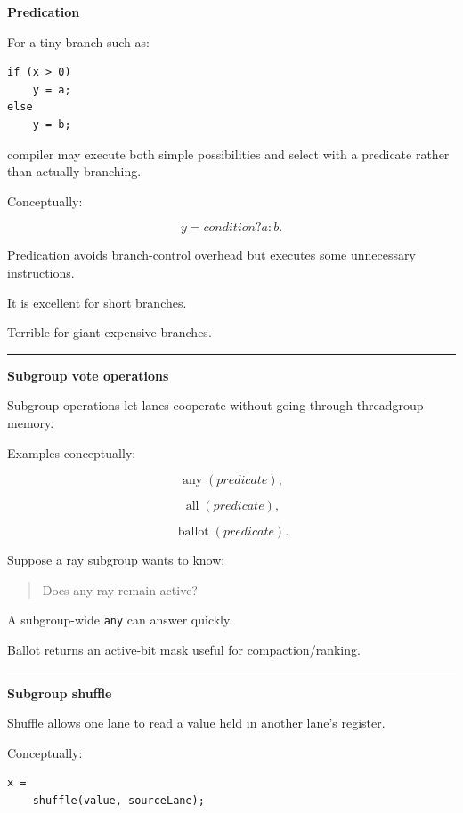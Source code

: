 \textbf{Predication}

For a tiny branch such as:

\protect{}\label{whgcgz}%
\begin{verbatim}
if (x > 0)
    y = a;
else
    y = b;
\end{verbatim}

compiler may execute both simple possibilities and select with a predicate rather than actually branching.

Conceptually:

\[
y=
condition?a:b.
\]

Predication avoids branch-control overhead but executes some unnecessary instructions.

It is excellent for short branches.

Terrible for giant expensive branches.

\begin{center}\rule{0.5\linewidth}{0.5pt}\end{center}

\textbf{Subgroup vote operations}

Subgroup operations let lanes cooperate without going through threadgroup memory.

Examples conceptually:

\[
\operatorname{any}(predicate),
\]

\[
\operatorname{all}(predicate),
\]

\[
\operatorname{ballot}(predicate).
\]

Suppose a ray subgroup wants to know:

\begin{quote}
Does any ray remain active?
\end{quote}

A subgroup-wide \texttt{any} can answer quickly.

Ballot returns an active-bit mask useful for compaction/ranking.

\begin{center}\rule{0.5\linewidth}{0.5pt}\end{center}

\textbf{Subgroup shuffle}

Shuffle allows one lane to read a value held in another lane's register.

Conceptually:

\protect{}\label{kjzl1q}%
\begin{verbatim}
x =
    shuffle(value, sourceLane);
\end{verbatim}

